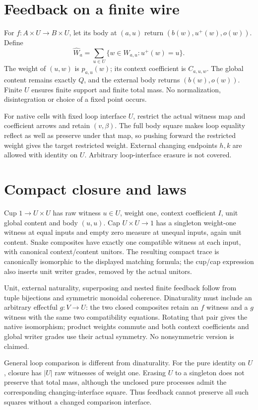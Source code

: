 \documentclass{article}
\begin{document}
\section{Feedback on a finite wire}
For $f:A\times U\to B\times U$, let its body at $(a,u)$ return $(b(w),u^+(w),o(w))$. Define
\[\widehat W_a=\sum_{u\in U}\{w\in W_{a,u}:u^+(w)=u\}.\]
The weight of $(u,w)$ is $p_{a,u}(w)$; its context coefficient is $C_{a,u,w}$. The global content remains exactly $Q$, and the external body returns $(b(w),o(w))$. Finite $U$ ensures finite support and finite total mass. No normalization, disintegration or choice of a fixed point occurs.

For native cells with fixed loop interface $U$, restrict the actual witness map and coefficient arrows and retain $(v,\beta)$. The full body square makes loop equality reflect as well as preserve under that map, so pushing forward the restricted weight gives the target restricted weight. External changing endpoints $h,k$ are allowed with identity on $U$. Arbitrary loop-interface erasure is not covered.
\section{Compact closure and laws}
Cup $1\to U\times U$ has raw witness $u\in U$, weight one, context coefficient $I$, unit global content and body $(u,u)$. Cap $U\times U\to1$ has a singleton weight-one witness at equal inputs and empty zero measure at unequal inputs, again unit content. Snake composites have exactly one compatible witness at each input, with canonical context/content unitors. The resulting compact trace is canonically isomorphic to the displayed matching formula; the cup/cap expression also inserts unit writer grades, removed by the actual unitors.

Unit, external naturality, superposing and nested finite feedback follow from tuple bijections and symmetric monoidal coherence. Dinaturality must include an arbitrary effectful $g:V\to U$: the two closed composites retain an $f$ witness and a $g$ witness with the same two compatibility equations. Rotating that pair gives the native isomorphism; product weights commute and both context coefficients and global writer grades use their actual symmetry. No nonsymmetric version is claimed.

General loop comparison is different from dinaturality. For the pure identity on $U$, closure has $|U|$ raw witnesses of weight one. Erasing $U$ to a singleton does not preserve that total mass, although the unclosed pure processes admit the corresponding changing-interface square. Thus feedback cannot preserve all such squares without a changed comparison interface.
\end{document}
